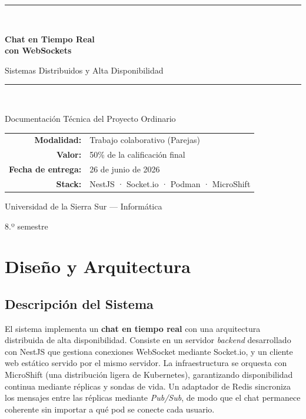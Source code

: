 \documentclass[11pt,a4paper]{article}
\begin{document}
\begin{titlepage}
\centering
\vspace*{2cm}
{\color{azul}\rule{\linewidth}{1.5pt}}\\[0.4cm]
{\Huge\bfseries Chat en Tiempo Real\\ con WebSockets\par}
\vspace{0.4cm}
{\Large Sistemas Distribuidos y Alta Disponibilidad\par}
{\color{azul}\rule{\linewidth}{1.5pt}}\\[1.5cm]

{\large Documentación Técnica del Proyecto Ordinario\par}
\vspace{2cm}

\begin{tabular}{rl}
\textbf{Modalidad:} & Trabajo colaborativo (Parejas)\\[4pt]
\textbf{Valor:} & 50\% de la calificación final\\[4pt]
\textbf{Fecha de entrega:} & 26 de junio de 2026\\[4pt]
\textbf{Stack:} & NestJS · Socket.io · Podman · MicroShift\\
\end{tabular}

\vfill
{\large Universidad de la Sierra Sur --- Informática\par}
{\large 8.º semestre\par}
\end{titlepage}

\tableofcontents
\newpage

\section{Diseño y Arquitectura}

\subsection{Descripción del Sistema}
El sistema implementa un \textbf{chat en tiempo real} con una arquitectura
distribuida de alta disponibilidad. Consiste en un servidor \emph{backend}
desarrollado con NestJS que gestiona conexiones WebSocket mediante Socket.io,
y un cliente web estático servido por el mismo servidor. La infraestructura se
orquesta con MicroShift (una distribución ligera de Kubernetes), garantizando
disponibilidad continua mediante réplicas y sondas de vida. Un adaptador de
Redis sincroniza los mensajes entre las réplicas mediante \emph{Pub/Sub}, de modo
que el chat permanece coherente sin importar a qué pod se conecte cada usuario.
\end{document}
